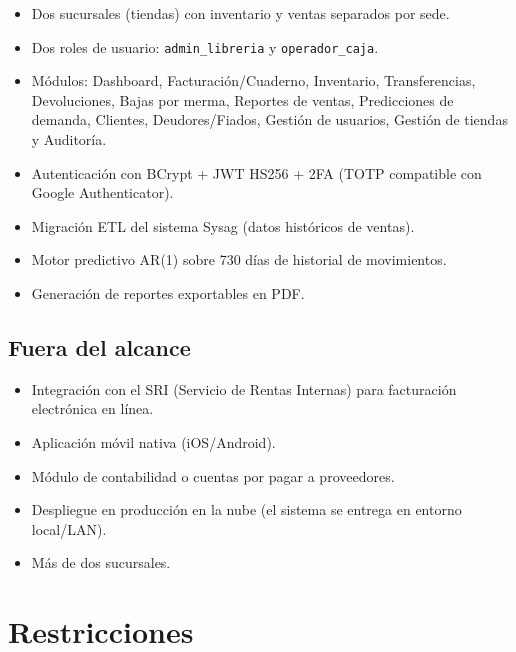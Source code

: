 \documentclass[12pt,a4paper,oneside]{report}
\begin{document}
\begin{itemize}[leftmargin=1.5cm]
  \item Dos sucursales (tiendas) con inventario y ventas separados por sede.
  \item Dos roles de usuario: \texttt{admin\_libreria} y \texttt{operador\_caja}.
  \item Módulos: Dashboard, Facturación/Cuaderno, Inventario, Transferencias, Devoluciones, Bajas por merma, Reportes de ventas, Predicciones de demanda, Clientes, Deudores/Fiados, Gestión de usuarios, Gestión de tiendas y Auditoría.
  \item Autenticación con BCrypt + JWT HS256 + 2FA (TOTP compatible con Google Authenticator).
  \item Migración ETL del sistema Sysag (datos históricos de ventas).
  \item Motor predictivo AR(1) sobre 730 días de historial de movimientos.
  \item Generación de reportes exportables en PDF.
\end{itemize}

\subsection{Fuera del alcance}

\begin{itemize}[leftmargin=1.5cm]
  \item Integración con el SRI (Servicio de Rentas Internas) para facturación electrónica en línea.
  \item Aplicación móvil nativa (iOS/Android).
  \item Módulo de contabilidad o cuentas por pagar a proveedores.
  \item Despliegue en producción en la nube (el sistema se entrega en entorno local/LAN).
  \item Más de dos sucursales.
\end{itemize}

\section{Restricciones}
\end{document}
